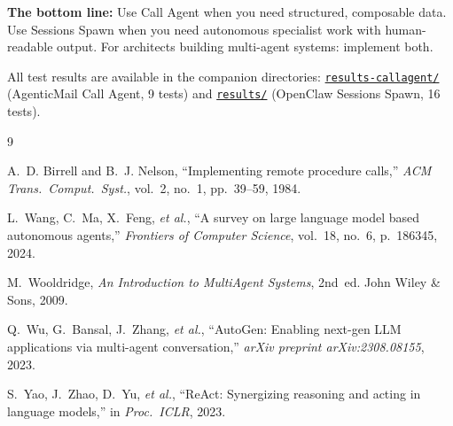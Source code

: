 \documentclass[11pt,twocolumn]{article}
\newcommand{\ghbase}{https://github.com/agenticmail/agenticmail/blob/main/research/agent-rpc-vs-spawn}
\begin{document}
\textbf{The bottom line:} Use Call Agent when you need structured, composable data. Use Sessions Spawn when you need autonomous specialist work with human-readable output. For architects building multi-agent systems: implement both.

All test results are available in the companion directories: \href{\ghbase/results-callagent}{\texttt{results-callagent/}} (AgenticMail Call Agent, 9 tests) and \href{\ghbase/results}{\texttt{results/}} (OpenClaw Sessions Spawn, 16 tests).

\begin{thebibliography}{9}

A.~D. Birrell and B.~J. Nelson, ``Implementing remote procedure calls,'' \emph{ACM Trans.\ Comput.\ Syst.}, vol.~2, no.~1, pp.~39--59, 1984.

L.~Wang, C.~Ma, X.~Feng, \emph{et al.}, ``A survey on large language model based autonomous agents,'' \emph{Frontiers of Computer Science}, vol.~18, no.~6, p.~186345, 2024.

M.~Wooldridge, \emph{An Introduction to MultiAgent Systems}, 2nd~ed. John Wiley \& Sons, 2009.

Q.~Wu, G.~Bansal, J.~Zhang, \emph{et al.}, ``AutoGen: Enabling next-gen LLM applications via multi-agent conversation,'' \emph{arXiv preprint arXiv:2308.08155}, 2023.

S.~Yao, J.~Zhao, D.~Yu, \emph{et al.}, ``ReAct: Synergizing reasoning and acting in language models,'' in \emph{Proc.\ ICLR}, 2023.

\end{thebibliography}
\end{document}

